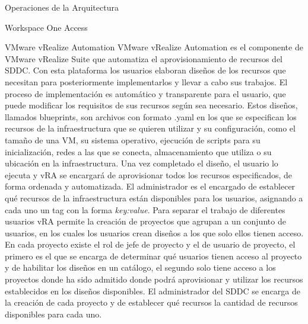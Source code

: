 \begin{subsection}{Operaciones de la Arquitectura}
\begin{subsubsection}{Workspace One Access}

    \end{subsubsection}

    \begin{subsubsection}{VMware vRealize Automation}
        VMware vRealize Automation es el componente de VMware vRealize Suite que automatiza el aprovisionamiento de recursos del SDDC. Con esta plataforma los usuarios elaboran diseños de los recursos que necesitan para posteriormente implementarlos y llevar a cabo sus trabajos. El proceso de implementación es automático y transparente para el usuario, que puede modificar los requisitos de sus recursos según sea necesario. Estos diseños, llamados blueprints, son archivos con formato .yaml en los que se especifican los recursos de la infraestructura que se quieren utilizar y su configuración, como el tamaño de una VM, su sistema operativo, ejecución de scripts para su inicialización, redes a las que se conecta, almacenamiento que utiliza o su ubicación en la infraestructura. Una vez completado el diseño, el usuario lo ejecuta y vRA se encargará de aprovisionar todos los recursos especificados, de forma ordenada y automatizada. El administrador es el encargado de establecer qué recursos de la infraestructura están disponibles para los usuarios, asignando a cada uno un tag con la forma \textit{key:value}.
        Para separar el trabajo de diferentes usuarios vRA permite la creación de proyectos que agrupan a un conjunto de usuarios, en los cuales los usuarios crean diseños a los que solo ellos tienen acceso. En cada proyecto existe el rol de jefe de proyecto y el de usuario de proyecto, el primero es el que se encarga de determinar qué usuarios tienen acceso al proyecto y de habilitar los diseños en un catálogo, el segundo solo tiene acceso a los proyectos donde ha sido admitido donde podrá aprovisionar y utilizar los recursos establecidos en los diseños disponibles. El administrador del SDDC se encarga de la creación de cada proyecto y de establecer qué recursos la cantidad de recursos disponibles para cada uno.
        

\end{subsubsection}
\end{subsection}
